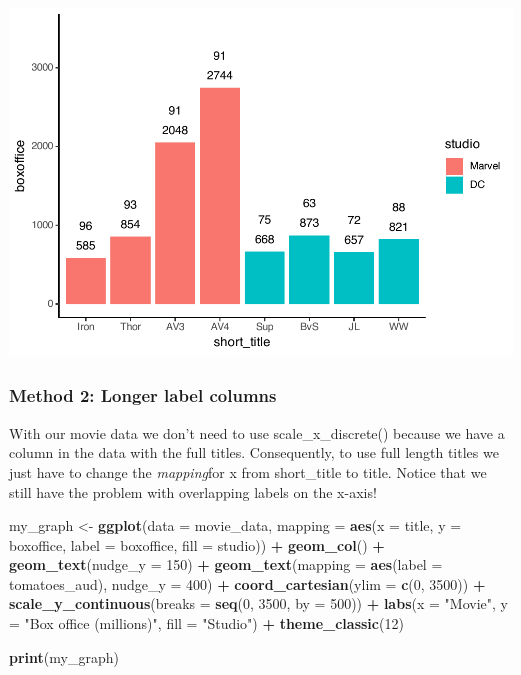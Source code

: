 \documentclass[
]{krantz}
\makeatletter
\newenvironment{Shaded}{\begin{snugshade}}{\end{snugshade}}
\newcommand{\DataTypeTok}[1]{\textcolor[rgb]{0.27,0.27,0.27}{#1}}
\newcommand{\DecValTok}[1]{\textcolor[rgb]{0.06,0.06,0.06}{#1}}
\newcommand{\KeywordTok}[1]{\textcolor[rgb]{0.27,0.27,0.27}{\textbf{#1}}}
\newcommand{\NormalTok}[1]{#1}
\newcommand{\OperatorTok}[1]{\textcolor[rgb]{0.43,0.43,0.43}{\textbf{#1}}}
\newcommand{\StringTok}[1]{\textcolor[rgb]{0.5,0.5,0.5}{#1}}
\newenvironment{kframe}{%
\medskip{}
\setlength{\fboxsep}{.8em}
 \def\at@end@of@kframe{}%
 \ifinner\ifhmode%
  \def\at@end@of@kframe{\end{minipage}}%
  \begin{minipage}{\columnwidth}%
 \fi\fi%
 \def\FrameCommand##1{\hskip\@totalleftmargin \hskip-\fboxsep
 \colorbox{shadecolor}{##1}\hskip-\fboxsep
     \hskip-\linewidth \hskip-\@totalleftmargin \hskip\columnwidth}%
 \MakeFramed {\advance\hsize-\width
   \@totalleftmargin\z@ \linewidth\hsize
   \@setminipage}}%
 {\par\unskip\endMakeFramed%
 \at@end@of@kframe}
\renewenvironment{Shaded}{\begin{kframe}}{\end{kframe}}
\makeatother
\begin{document}
\includegraphics[width=0.65\linewidth]{bookdown_files/figure-latex/unnamed-chunk-122-1}

\hypertarget{method-2-longer-label-columns}{%
\subsubsection{Method 2: Longer label columns}\label{method-2-longer-label-columns}}

With our movie data we don't need to use scale\_x\_discrete() because we have a column in the data with the full titles. Consequently, to use full length titles we just have to change the \emph{mapping}for x from short\_title to title. Notice that we still have the problem with overlapping labels on the x-axis!

\begin{Shaded}
\begin{Highlighting}[]
\NormalTok{my_graph <-}\StringTok{ }\KeywordTok{ggplot}\NormalTok{(}\DataTypeTok{data =}\NormalTok{ movie_data,}
           \DataTypeTok{mapping =} \KeywordTok{aes}\NormalTok{(}\DataTypeTok{x =}\NormalTok{ title,}
                         \DataTypeTok{y =}\NormalTok{ boxoffice,}
                         \DataTypeTok{label =}\NormalTok{ boxoffice, }
                         \DataTypeTok{fill =}\NormalTok{ studio)) }\OperatorTok{+}
\StringTok{  }\KeywordTok{geom_col}\NormalTok{() }\OperatorTok{+}
\StringTok{  }\KeywordTok{geom_text}\NormalTok{(}\DataTypeTok{nudge_y =} \DecValTok{150}\NormalTok{)  }\OperatorTok{+}
\StringTok{  }\KeywordTok{geom_text}\NormalTok{(}\DataTypeTok{mapping =} \KeywordTok{aes}\NormalTok{(}\DataTypeTok{label =}\NormalTok{ tomatoes_aud), }
            \DataTypeTok{nudge_y =} \DecValTok{400}\NormalTok{) }\OperatorTok{+}
\StringTok{  }\KeywordTok{coord_cartesian}\NormalTok{(}\DataTypeTok{ylim =} \KeywordTok{c}\NormalTok{(}\DecValTok{0}\NormalTok{, }\DecValTok{3500}\NormalTok{)) }\OperatorTok{+}
\StringTok{  }\KeywordTok{scale_y_continuous}\NormalTok{(}\DataTypeTok{breaks =} \KeywordTok{seq}\NormalTok{(}\DecValTok{0}\NormalTok{, }\DecValTok{3500}\NormalTok{, }\DataTypeTok{by =} \DecValTok{500}\NormalTok{)) }\OperatorTok{+}
\StringTok{  }\KeywordTok{labs}\NormalTok{(}\DataTypeTok{x =} \StringTok{"Movie"}\NormalTok{,}
       \DataTypeTok{y =} \StringTok{"Box office (millions)"}\NormalTok{,}
       \DataTypeTok{fill =} \StringTok{"Studio"}\NormalTok{) }\OperatorTok{+}
\StringTok{  }\KeywordTok{theme_classic}\NormalTok{(}\DecValTok{12}\NormalTok{)}
  

\KeywordTok{print}\NormalTok{(my_graph)}
\end{Highlighting}
\end{Shaded}
\end{document}
